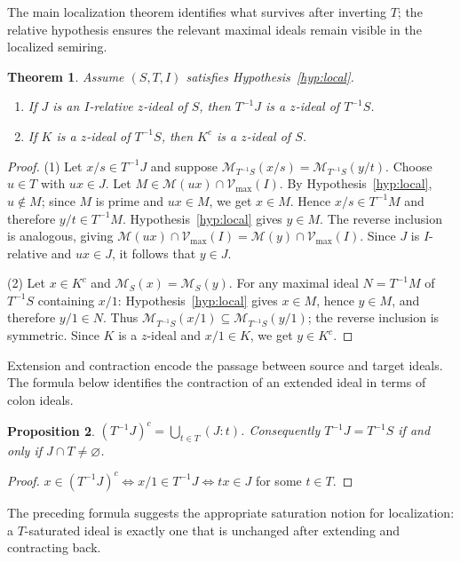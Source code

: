 \documentclass[11pt,leqno]{amsart}
\theoremstyle{plain}
\newtheorem{theorem}{Theorem}[section]
\newtheorem{proposition}[theorem]{Proposition}
\theoremstyle{definition}
\theoremstyle{remark}
\numberwithin{equation}{section}
\newcommand{\M}{\mathcal M}
\begin{document}
The main localization theorem identifies what survives after inverting
$T$; the relative hypothesis ensures the relevant maximal ideals
remain visible in the localized semiring.

\begin{theorem}\label{loc15}
Assume $(S,T,I)$ satisfies Hypothesis~\ref{hyp:local}.
\begin{enumerate}
\item If $J$ is an $I$-relative $z$-ideal of $S$,
  then $T^{-1}J$ is a $z$-ideal of $T^{-1}S$.
\item If $K$ is a $z$-ideal of $T^{-1}S$,
  then $K^c$ is a $z$-ideal of $S$.
\end{enumerate}
\end{theorem}
\begin{proof}
(1) Let $x/s\in T^{-1}J$ and suppose
$\M_{T^{-1}S}(x/s)=\M_{T^{-1}S}(y/t)$.
Choose $u\in T$ with $ux\in J$.
Let $M\in\M(ux)\cap\mathcal{V}_{\max}(I)$.
By Hypothesis~\ref{hyp:local}, $u\notin M$;
since $M$ is prime and $ux\in M$, we get $x\in M$.
Hence $x/s\in T^{-1}M$ and therefore $y/t\in T^{-1}M$.
Hypothesis~\ref{hyp:local} gives $y\in M$.
The reverse inclusion is analogous, giving
$\M(ux)\cap\mathcal{V}_{\max}(I)=\M(y)\cap\mathcal{V}_{\max}(I)$.
Since $J$ is $I$-relative and $ux\in J$, it follows that $y\in J$.

(2) Let $x\in K^c$ and $\M_S(x)=\M_S(y)$.
For any maximal ideal $N=T^{-1}M$ of $T^{-1}S$ containing $x/1$:
Hypothesis~\ref{hyp:local} gives $x\in M$, hence $y\in M$,
and therefore $y/1\in N$.
Thus $\M_{T^{-1}S}(x/1)\subseteq\M_{T^{-1}S}(y/1)$;
the reverse inclusion is symmetric.
Since $K$ is a $z$-ideal and $x/1\in K$, we get $y\in K^c$.
\end{proof}

Extension and contraction encode the passage between source and
target ideals.
The formula below identifies the contraction of an extended ideal
in terms of colon ideals.

\begin{proposition}\label{prop:extension-contraction}
$(T^{-1}J)^c=\bigcup_{t\in T}(J:t)$.
Consequently $T^{-1}J=T^{-1}S$ if and only if $J\cap T\neq\varnothing$.
\end{proposition}
\begin{proof}
$x\in(T^{-1}J)^c\Leftrightarrow x/1\in T^{-1}J\Leftrightarrow
tx\in J$ for some $t\in T$.
\end{proof}

The preceding formula suggests the appropriate saturation notion
for localization: a $T$-saturated ideal is exactly one that is
unchanged after extending and contracting back.
\end{document}
